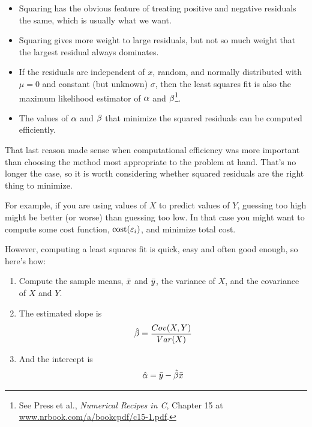\documentclass[12pt]{book}
\begin{document}
\begin{itemize}

\item Squaring has the obvious feature of treating positive and
negative residuals the same, which is usually what we want.

\item Squaring gives more weight to large residuals, but not
so much weight that the largest residual always dominates.

\item If the residuals are independent of $x$, random, and normally
  distributed with $\mu=0$ and constant (but unknown) $\sigma$, then
  the least squares fit is also the maximum likelihood estimator of
  $\alpha$ and $\beta$\footnote{See Press et al., {\em Numerical Recipes in C},
    Chapter 15 at \url{www.nrbook.com/a/bookcpdf/c15-1.pdf}.}.


\item The values of $\alpha$ and $\beta$ that minimize the squared
  residuals can be computed efficiently.

\end{itemize}

That last reason made sense when computational efficiency was more
important than choosing the method most appropriate to the problem
at hand.  That's no longer the case, so it is worth considering
whether squared residuals are the right thing to minimize.


For example, if you are using values of $X$ to predict values of $Y$,
guessing too high might be better (or worse) than guessing too low.
In that case you might want to compute some cost function,
$\mathrm{cost}(\varepsilon_i)$, and minimize total cost.


However, computing a least squares fit is quick, easy and often good
enough, so here's how:

\begin{enumerate}

\item Compute the sample means, $\bar{x}$ and $\bar{y}$, the variance
of $X$, and the covariance of $X$ and $Y$.

\item The estimated slope is
%
\[ \hat{\beta} = \frac{Cov(X,Y)}{Var(X)} \]
%
\item And the intercept is
%
\[ \hat{\alpha} = \bar{y} - \hat{\beta} \bar{x} \]
%
\end{enumerate}
\end{document}
